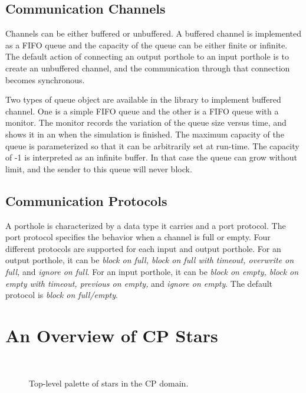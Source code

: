 \subsection{Communication Channels}

Channels can be either buffered or unbuffered.  A buffered channel
is implemented as a FIFO queue and the capacity of the queue can be
either finite or infinite.  The default action of connecting an output
porthole to an input porthole is to create an unbuffered channel, and
the communication through that connection becomes synchronous.  

Two types of queue object are available in the library to implement
buffered channel.  One is a simple FIFO queue and the other is a FIFO
queue with a monitor.  The monitor records the variation of the queue
size versus time, and shows it in an  when the simulation
is finished.  The maximum capacity of the queue is parameterized so
that it can be arbitrarily set at run-time.   The capacity of -1 is
interpreted as an infinite buffer.  In that case the queue can grow
without limit, and the sender to this queue will never block.

\subsection{Communication Protocols}

A porthole is characterized by a data type it carries and a port
protocol.  The port protocol specifies the behavior when a channel is
full or empty.  Four different protocols are supported for each input
and output porthole.  For an output porthole, it can be \emph{block on
full, block on full with timeout, overwrite on full,} and \emph{ignore
on full}.  For an input porthole, it can be \emph{block on empty,
block on empty with timeout, previous on empty,} and \emph{ignore on
empty}.  The default protocol is \emph{block on full/empty}.

\section{An Overview of CP Stars}

\begin{figure}
\begin{center}
\ 
\end{center}
\caption{Top-level palette of stars in the CP domain.}
\label{figure CP stars}
\end{figure}

